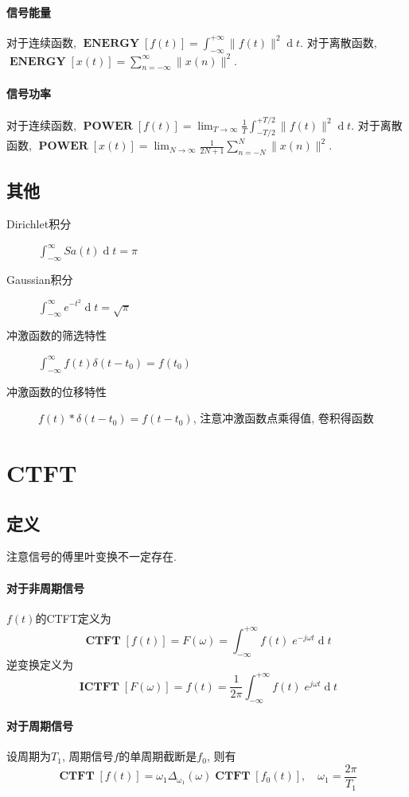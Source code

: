 \documentclass{ctexart}
\DeclareMathOperator{\CTFT}{\mathbf{CTFT}}
\DeclareMathOperator{\ICTFT}{\mathbf{ICTFT}}
\DeclareMathOperator{\ENERGY}{\mathbf{ENERGY}}
\DeclareMathOperator{\POWER}{\mathbf{POWER}}
\DeclareMathOperator{\ud}{\mathrm{d}}
\begin{document}
\paragraph{信号能量} 对于连续函数, $\ENERGY[f(t)] = \int_{-\infty}^{+\infty} \|f(t)\|^2 \ud t$.
    对于离散函数, $\ENERGY[x(t)] = \sum_{n = -\infty}^{\infty} \|x(n)\|^2$.
\paragraph{信号功率} 对于连续函数, $\POWER[f(t)] = \lim_{T \to \infty} \frac{1}{T} \int_{-T/2}^{+T/2} \|f(t)\|^2 \ud t$.
    对于离散函数, $\POWER[x(t)] = \lim_{N \to \infty} \frac{1}{2N + 1} \sum_{n = -N}^{N} \|x(n)\|^2$.
\subsection{其他}
    \begin{description}
        \item[Dirichlet积分] $\int_{-\infty}^{\infty} Sa(t) \ud t = \pi$
        \item[Gaussian积分] $\int_{-\infty}^{\infty} e^{-t^2} \ud t = \sqrt{\pi}$
        \item[冲激函数的筛选特性] $\int_{-\infty}^{\infty} f(t) \delta(t - t_0) = f(t_0)$
        \item[冲激函数的位移特性] $f(t) * \delta(t - t_0) = f(t - t_0)$, 注意冲激函数点乘得值, 卷积得函数
    \end{description}

\section{CTFT}
\subsection{定义}
注意信号的傅里叶变换不一定存在.
\paragraph{对于非周期信号} $f(t)$的CTFT定义为 \[
    \CTFT[f(t)] = F(\omega) = \int_{-\infty}^{+\infty} f(t)\; e^{-j \omega t} \ud t \]
    逆变换定义为 \[
    \ICTFT[F(\omega)] = f(t) = \frac{1}{2\pi} \int_{-\infty}^{+\infty} f(t)\; e^{j \omega t} \ud t \]

\paragraph{对于周期信号}
    设周期为$T_1$, 周期信号$f$的单周期截断是$f_0$, 则有 \[
        \CTFT[ f(t) ] = \omega_1 \Delta_{\omega_1}(\omega) \CTFT[ f_0(t) ] ,\quad \omega_1 = \frac{2\pi}{T_1}  \]
\end{document}
